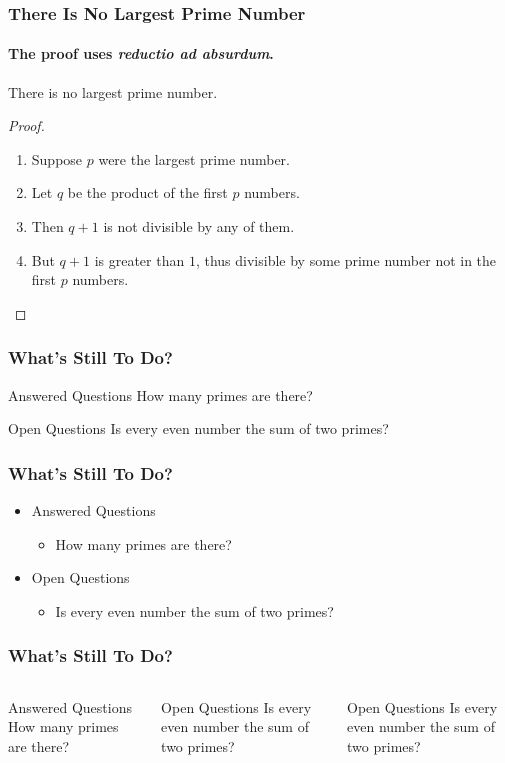 \documentclass{beamer}
\begin{document}
\begin{frame}
\frametitle{There Is No Largest Prime Number}
\framesubtitle{The proof uses \textit{reductio ad absurdum}.}
\begin{theorem}
There is no largest prime number.
\end{theorem}
\begin{proof}
\begin{enumerate}
\item<1-> Suppose $p$ were the largest prime number.
\item<2-> Let $q$ be the product of the first $p$ numbers.
\item<3-> Then $q + 1$ is not divisible by any of them.
\item<1-> But $q + 1$ is greater than $1$, thus divisible by some prime
number not in the first $p$ numbers.\qedhere
\end{enumerate}
\end{proof}
\end{frame}

\begin{frame}
\frametitle{What’s Still To Do?}
\begin{block}{Answered Questions}
How many primes are there?
\end{block}
\begin{block}{Open Questions}
Is every even number the sum of two primes?
\end{block}
\end{frame}


\begin{frame}
\frametitle{What’s Still To Do?}
\begin{itemize}
\item Answered Questions
\begin{itemize}
\item How many primes are there?
\end{itemize}
\item Open Questions
\begin{itemize}
\item Is every even number the sum of two primes?
\end{itemize}
\end{itemize}
\end{frame}


\begin{frame}
\frametitle{What’s Still To Do?}

\begin{columns}
\begin{block}{Answered Questions}
How many primes are there?
\end{block}

\begin{alertblock}{Open Questions}
Is every even number the sum of two primes?
\end{alertblock}
\begin{exampleblock}{Open Questions}
Is every even number the sum of two primes?
\end{exampleblock}

\end{columns}
\end{frame}
\end{document}
